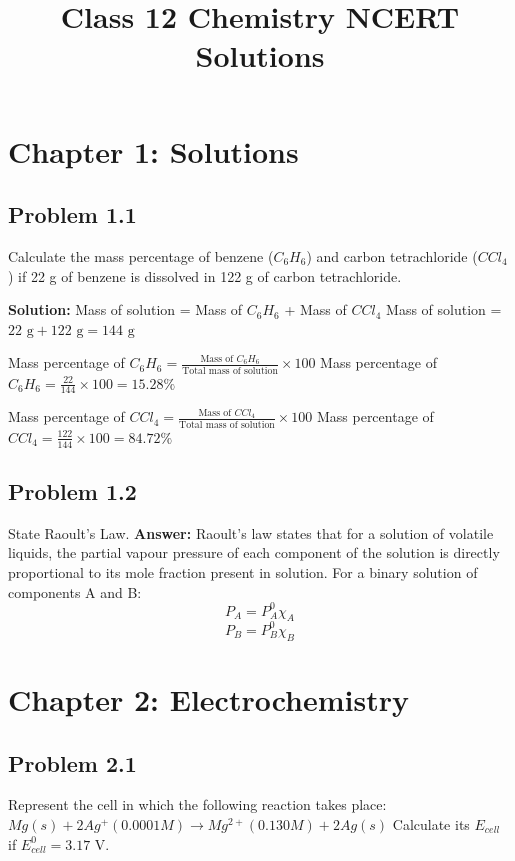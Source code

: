 \documentclass[12pt, a4paper]{article}
\title{Class 12 Chemistry NCERT Solutions}
\author{}
\date{}
\begin{document}
\maketitle

\section*{Chapter 1: Solutions}

\subsection*{Problem 1.1}
Calculate the mass percentage of benzene ($C_6H_6$) and carbon tetrachloride ($CCl_4$) if 22 g of benzene is dissolved in 122 g of carbon tetrachloride.

\textbf{Solution:}
Mass of solution = Mass of $C_6H_6$ + Mass of $CCl_4$
Mass of solution = $22\text{ g} + 122\text{ g} = 144\text{ g}$

Mass percentage of $C_6H_6 = \frac{\text{Mass of } C_6H_6}{\text{Total mass of solution}} \times 100$
Mass percentage of $C_6H_6 = \frac{22}{144} \times 100 = 15.28\%$

Mass percentage of $CCl_4 = \frac{\text{Mass of } CCl_4}{\text{Total mass of solution}} \times 100$
Mass percentage of $CCl_4 = \frac{122}{144} \times 100 = 84.72\%$

\subsection*{Problem 1.2}
State Raoult's Law.
\textbf{Answer:} Raoult's law states that for a solution of volatile liquids, the partial vapour pressure of each component of the solution is directly proportional to its mole fraction present in solution. For a binary solution of components A and B:
\[ P_A = P_A^0 \chi_A \]
\[ P_B = P_B^0 \chi_B \]

\section*{Chapter 2: Electrochemistry}

\subsection*{Problem 2.1}
Represent the cell in which the following reaction takes place:
$Mg(s) + 2Ag^+(0.0001 M) \rightarrow Mg^{2+}(0.130 M) + 2Ag(s)$
Calculate its $E_{cell}$ if $E^0_{cell} = 3.17$ V.
\end{document}
